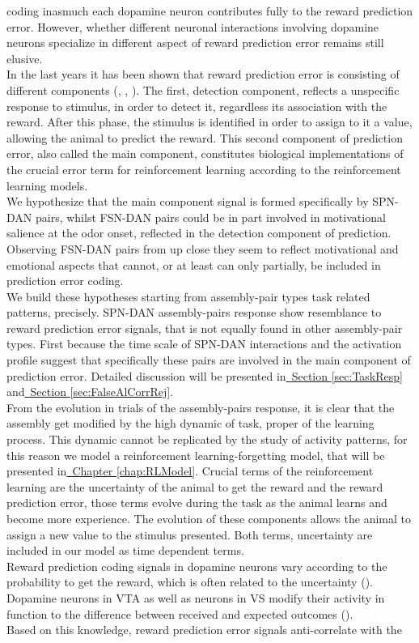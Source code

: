 coding inasmuch each dopamine neuron contributes fully to the reward prediction error. However, whether different neuronal interactions involving dopamine neurons specialize in different aspect of reward prediction error remains still elusive.\\In the last years it has been shown that reward prediction error is consisting of different components (\cite{Nomoto2010}, \cite{Fiorillo2013b}, \cite{Schultz2016}). The first, detection component, reflects a unspecific response to stimulus, in order to detect it, regardless its association with the reward. After this phase, the stimulus is identified in order to assign to it a value, allowing the animal to predict the reward. This second component of prediction error, also called the main component, constitutes biological implementations of the crucial error term for reinforcement learning according to the reinforcement learning models.\\We hypothesize that the main component signal is formed specifically by SPN-DAN pairs, whilst FSN-DAN pairs could be in part involved in motivational salience at the odor onset, reflected in the detection component of prediction. Observing FSN-DAN pairs from up close they seem to reflect motivational and emotional aspects that cannot, or at least can only partially, be included in prediction error coding.\\We build these hypotheses starting from assembly-pair types task related patterns, precisely. SPN-DAN assembly-pairs response show resemblance to reward prediction error signals, that is not equally found in other assembly-pair types. First because the time scale of SPN-DAN interactions and the activation profile suggest that specifically these pairs are involved in the main component of prediction error. Detailed discussion will be presented in\hyperref[sec:TaskResp]{~Section \ref*{sec:TaskResp}} and\hyperref[sec:FalseAlCorrRej]{~Section \ref*{sec:FalseAlCorrRej}}.\\From the evolution in trials of the assembly-pairs response, it is clear that the assembly get modified by the high dynamic of task, proper of the learning process. This dynamic cannot be replicated by the study of activity patterns, for this reason we model a reinforcement learning-forgetting model, that will be presented in\hyperref[chap:RLModel]{~Chapter \ref*{chap:RLModel}}. Crucial terms of the reinforcement learning are the uncertainty of the animal to get the reward and the reward prediction error, those terms evolve during the task as the animal learns and become more experience. The evolution of these components allows the animal to assign a new value to the stimulus presented. Both terms, uncertainty are included in our model as time dependent terms.\\Reward prediction coding signals in dopamine neurons vary according to the probability to get the reward, which is often related to the uncertainty (\cite{Schultz1992}). Dopamine neurons in VTA as well as neurons in VS modify their activity in function to the difference between received and expected outcomes (\cite{Fiorillo}).\\Based on this knowledge, reward prediction error signals anti-correlate with the 